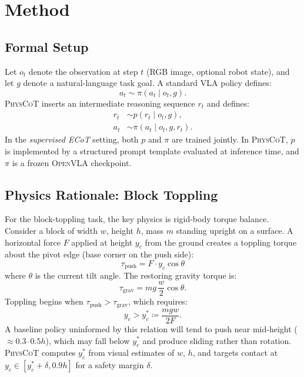 \documentclass{article}
\newcommand{\physcot}{\textsc{PhysCoT}}
\newcommand{\openvla}{\textsc{OpenVLA}}
\newcommand{\obs}{o_t}
\newcommand{\act}{a_t}
\newcommand{\rea}{r_t}
\newcommand{\goal}{g}
\begin{document}
\section{Method}
\label{sec:method}

\subsection{Formal Setup}

Let $o_t$ denote the observation at step $t$ (RGB image, optional robot state),
and let $g$ denote a natural-language task goal.
A standard VLA policy defines:
\begin{equation}
  \act \sim \pi(\act \mid \obs, \goal).
  \label{eq:baseline}
\end{equation}
\physcot{} inserts an intermediate reasoning sequence $\rea$ and defines:
\begin{align}
  \rea &\sim p(\rea \mid \obs, \goal), \label{eq:physcot_r} \\
  \act &\sim \pi(\act \mid \obs, \goal, \rea). \label{eq:physcot_a}
\end{align}
In the \emph{supervised ECoT} setting, both $p$ and $\pi$ are trained jointly.
In \physcot{}, $p$ is implemented by a structured prompt template evaluated
at inference time, and $\pi$ is a frozen \openvla{} checkpoint.

\subsection{Physics Rationale: Block Toppling}

For the block-toppling task, the key physics is rigid-body torque balance.
Consider a block of width $w$, height $h$, mass $m$ standing upright on a surface.
A horizontal force $F$ applied at height $y_c$ from the ground creates a
toppling torque about the pivot edge (base corner on the push side):
\begin{equation}
  \tau_\text{push} = F \cdot y_c \cos\theta
  \label{eq:torque_push}
\end{equation}
where $\theta$ is the current tilt angle.
The restoring gravity torque is:
\begin{equation}
  \tau_\text{grav} = m g \,\frac{w}{2} \cos\theta.
  \label{eq:torque_grav}
\end{equation}
Toppling begins when $\tau_\text{push} > \tau_\text{grav}$, which requires:
\begin{equation}
  y_c > y_c^* \coloneqq \frac{mgw}{2F}.
  \label{eq:crit_height}
\end{equation}
A baseline policy uninformed by this relation will tend to push near mid-height
(\(\approx 0.3\text{--}0.5 h\)), which may fall below $y_c^*$ and produce
sliding rather than rotation.
\physcot{} computes $y_c^*$ from visual estimates of $w$, $h$, and targets
contact at $y_c \in [y_c^* + \delta, 0.9h]$ for a safety margin $\delta$.
\end{document}
